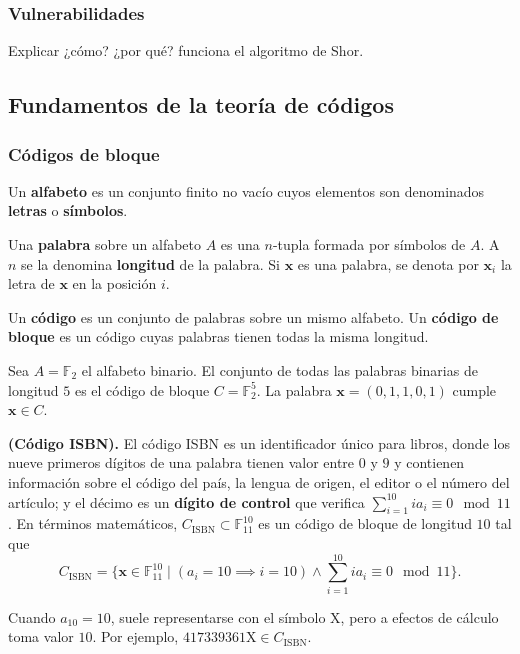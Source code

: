 \subsubsection{Vulnerabilidades}

Explicar ¿cómo? ¿por qué? funciona el algoritmo de Shor.

\subsection{Fundamentos de la teoría de códigos}

\subsubsection{Códigos de bloque}

\begin{definition}
	Un \textbf{alfabeto} es un conjunto finito no vacío cuyos elementos son denominados \textbf{letras} o \textbf{símbolos}.
\end{definition}

\begin{definition}
	Una \textbf{palabra} sobre un alfabeto $A$ es una $n$-tupla formada por símbolos de $A$. A $n$ se la denomina \textbf{longitud} de la palabra. Si $\textbf{x}$ es una palabra, se denota por $\textbf{x}_i$ la letra de $\textbf{x}$ en la posición $i$.
\end{definition}

\begin{definition}
	Un \textbf{código} es un conjunto de palabras sobre un mismo alfabeto. Un \textbf{código de bloque} es un código cuyas palabras tienen todas la misma longitud.
\end{definition}

\begin{example}
	Sea $A = \mathbb{F}_2$ el alfabeto binario. El conjunto de todas las palabras binarias de longitud $5$ es el código de bloque $C = \mathbb{F}_2^5$. La palabra $\textbf{x} = (0, 1, 1, 0, 1)$ cumple $\textbf{x} \in C$.
\end{example}

\begin{example} \textbf{(Código ISBN).}
	El código ISBN es un identificador único para libros, donde los nueve primeros dígitos de una palabra tienen valor entre $0$ y $9$ y contienen información sobre el código del país, la lengua de origen, el editor o el número del artículo; y el décimo es un \textbf{dígito de control} que verifica $\sum_{i=1}^{10} ia_i \equiv 0 \mod 11$. En términos matemáticos, $C_{\textrm{ISBN}}\subset\mathbb{F}_{11}^{10}$ es un código de bloque de longitud $10$ tal que
	\[C_{\textrm{ISBN}} = \{\textbf{x}\in\mathbb{F}_{11}^{10} \mid (a_i = 10 \implies i = 10) \wedge \sum_{i=1}^{10}ia_i \equiv 0 \mod 11\}.\]
	\begin{remark}
		Cuando $a_{10} = 10$, suele representarse con el símbolo $\textrm{X}$, pero a efectos de cálculo toma valor $10$. Por ejemplo, $\textrm{417339361X} \in C_{\textrm{ISBN}}$.
	\end{remark}
\end{example}

